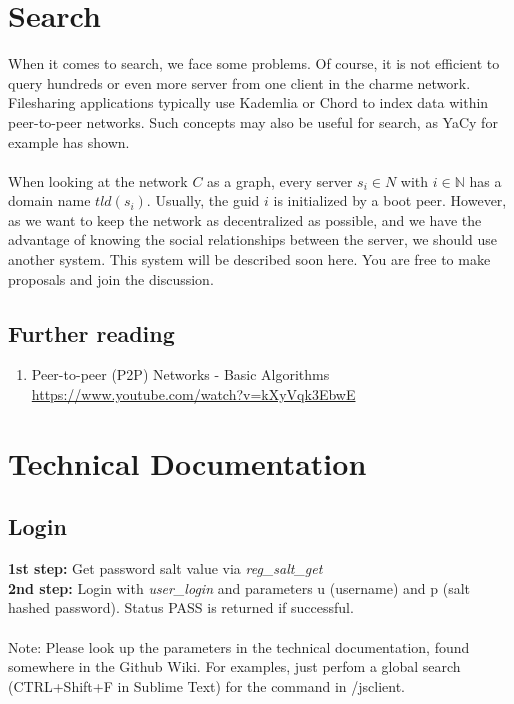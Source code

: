 \documentclass{scrartcl}
\begin{document}
  \section{Search}
  When it comes to search, we face some problems. Of course, it is not efficient to query hundreds or even more server from one client in the charme network. Filesharing applications typically use Kademlia  or Chord to index data within peer-to-peer networks. Such concepts may also be useful for search, as YaCy for example has shown.
\\\\
When looking at the network $C$ as a graph, every server $s_i  \in N$ with $i  \in \mathbb{N}$ has a domain name $tld(s_i)$.
Usually, the guid $i$ is initialized by a boot peer. However, as we want to keep the network as decentralized as possible, and we have the advantage of knowing the social relationships between the server, we should use another system. This system will be described soon here. You are free to make proposals and join the discussion.


\subsection{Further reading}
\begin{enumerate}
\item Peer-to-peer (P2P) Networks - Basic Algorithms \\\url{https://www.youtube.com/watch?v=kXyVqk3EbwE} %
\end{enumerate}

  \section{Technical Documentation}
\subsection{Login}
\textbf{ 1st step:} Get password salt value via \textit{reg\_salt\_get}\\
\textbf{2nd step:} Login with \textit{user\_login} and parameters u (username) and p (salt hashed password). Status PASS is returned if successful.
  \\\\
  Note: Please look up the parameters in the technical documentation, found somewhere in the Github Wiki. For examples, just perfom a global search (CTRL+Shift+F in Sublime Text) for the command in /jsclient.
\end{document}
